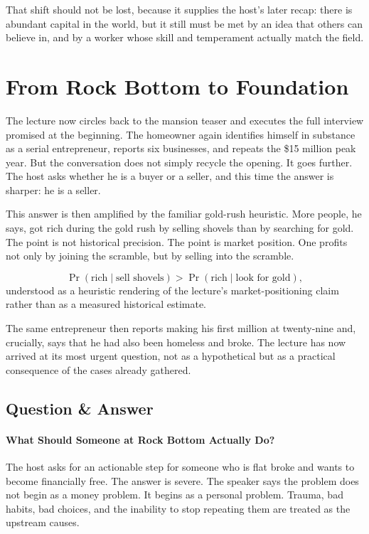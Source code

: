 That shift should not be lost, because it supplies the host's later recap: there is abundant capital in the world, but it still must be met by an idea that others can believe in, and by a worker whose skill and temperament actually match the field.

\section{From Rock Bottom to Foundation}

The lecture now circles back to the mansion teaser and executes the full interview promised at the beginning. The homeowner again identifies himself in substance as a serial entrepreneur, reports six businesses, and repeats the \$15 million peak year. But the conversation does not simply recycle the opening. It goes further. The host asks whether he is a buyer or a seller, and this time the answer is sharper: he is a seller.

This answer is then amplified by the familiar gold-rush heuristic. More people, he says, got rich during the gold rush by selling shovels than by searching for gold. The point is not historical precision. The point is market position. One profits not only by joining the scramble, but by selling into the scramble.

\begin{equation}
\Pr(\text{rich}\mid \text{sell shovels}) >
\Pr(\text{rich}\mid \text{look for gold}),
\end{equation}
understood as a heuristic rendering of the lecture's market-positioning claim rather than as a measured historical estimate.

The same entrepreneur then reports making his first million at twenty-nine and, crucially, says that he had also been homeless and broke. The lecture has now arrived at its most urgent question, not as a hypothetical but as a practical consequence of the cases already gathered.

\subsection{Question \& Answer}

\paragraph{What Should Someone at Rock Bottom Actually Do?}

The host asks for an actionable step for someone who is flat broke and wants to become financially free. The answer is severe. The speaker says the problem does not begin as a money problem. It begins as a personal problem. Trauma, bad habits, bad choices, and the inability to stop repeating them are treated as the upstream causes.

